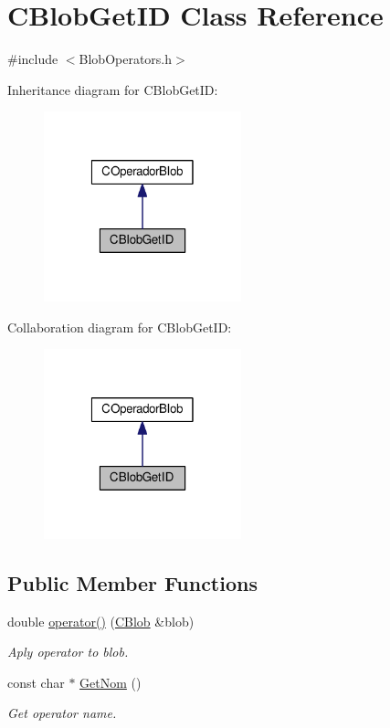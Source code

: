 \hypertarget{classCBlobGetID}{\section{C\-Blob\-Get\-I\-D Class Reference}
\label{classCBlobGetID}
}


{\ttfamily \#include $<$Blob\-Operators.\-h$>$}



Inheritance diagram for C\-Blob\-Get\-I\-D\-:\nopagebreak
\begin{figure}[H]
\begin{center}
\leavevmode
\includegraphics[width=162pt]{classCBlobGetID__inherit__graph}
\end{center}
\end{figure}


Collaboration diagram for C\-Blob\-Get\-I\-D\-:\nopagebreak
\begin{figure}[H]
\begin{center}
\leavevmode
\includegraphics[width=162pt]{classCBlobGetID__coll__graph}
\end{center}
\end{figure}
\subsection*{Public Member Functions}
\begin{DoxyCompactItemize}
\item 
double \hyperlink{classCBlobGetID_a01557f50837f1e52f3b6c690c0af6592}{operator()} (\hyperlink{classCBlob}{C\-Blob} \&blob)
\begin{DoxyCompactList}\small\item\em Aply operator to blob. \end{DoxyCompactList}\item 
const char $\ast$ \hyperlink{classCBlobGetID_a2e8c1e291d6b13bb1ecbbf8964cb9d2f}{Get\-Nom} ()
\begin{DoxyCompactList}\small\item\em Get operator name. \end{DoxyCompactList}\end{DoxyCompactItemize}


